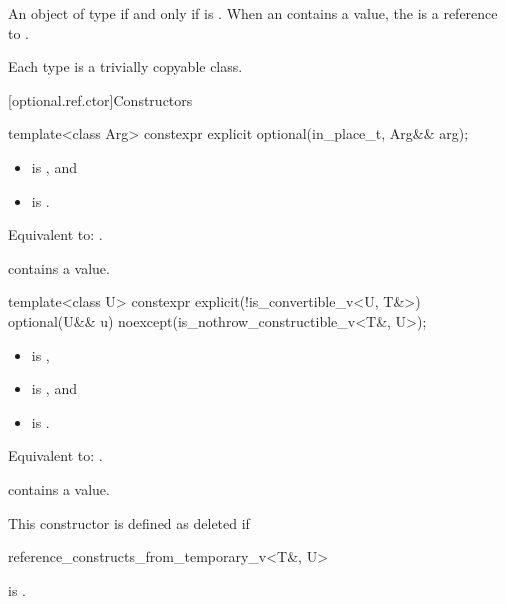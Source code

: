 \pnum
An object of type 
if and only if  is .
When an  contains a value,
the 
is a reference to .

\pnum
Each type  is a trivially copyable class.

[optional.ref.ctor]{Constructors}

\begin{itemdecl}
template<class Arg>
  constexpr explicit optional(in_place_t, Arg&& arg);
\end{itemdecl}

\begin{itemdescr}
\pnum
\constraints
\begin{itemize}
\item {} is , and
\item {} is .
\end{itemize}

\pnum
\effects
Equivalent to: .

\pnum
\ensures
{} contains a value.
\end{itemdescr}

\begin{itemdecl}
template<class U>
  constexpr explicit(!is_convertible_v<U, T&>)
  optional(U&& u) noexcept(is_nothrow_constructible_v<T&, U>);
\end{itemdecl}

\begin{itemdescr}
\pnum
\constraints
\begin{itemize}
\item {} is ,
\item {} is , and
\item {} is .
\end{itemize}

\pnum
\effects
Equivalent to: .

\pnum
\ensures
{} contains a value.

\pnum
\remarks
 This constructor is defined as deleted if
\begin{codeblock}
reference_constructs_from_temporary_v<T&, U>
\end{codeblock}
 is .
\end{itemdescr}

